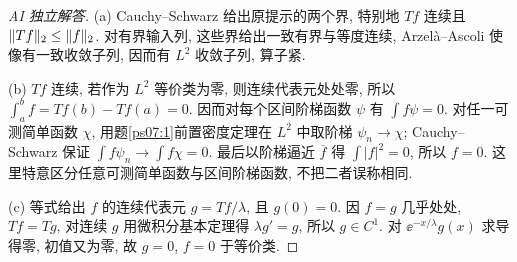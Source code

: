 \begin{proof}[AI 独立解答]
(a) Cauchy--Schwarz 给出原提示的两个界, 特别地 $Tf$ 连续且 $\lVert Tf\rVert_2\le\lVert f\rVert_2$. 对有界输入列, 这些界给出一致有界与等度连续, Arzelà--Ascoli 使像有一致收敛子列, 因而有 $L^2$ 收敛子列, 算子紧.

(b) $Tf$ 连续, 若作为 $L^2$ 等价类为零, 则连续代表元处处零, 所以 $\int_a^bf=Tf(b)-Tf(a)=0$. 因而对每个区间阶梯函数 $\psi$ 有 $\int f\psi=0$. 对任一可测简单函数 $\chi$, 用题\ref{ps07:1}前置密度定理在 $L^2$ 中取阶梯 $\psi_n\to\chi$; Cauchy--Schwarz 保证 $\int f\psi_n\to\int f\chi=0$. 最后以阶梯逼近 $\overline f$ 得 $\int|f|^2=0$, 所以 $f=0$. 这里特意区分任意可测简单函数与区间阶梯函数, 不把二者误称相同.

(c) 等式给出 $f$ 的连续代表元 $g=Tf/\lambda$, 且 $g(0)=0$. 因 $f=g$ 几乎处处, $Tf=Tg$, 对连续 $g$ 用微积分基本定理得 $\lambda g'=g$, 所以 $g\in C^1$. 对 $\ee^{-x/\lambda}g(x)$ 求导得零, 初值又为零, 故 $g=0$, $f=0$ 于等价类.
\end{proof}

